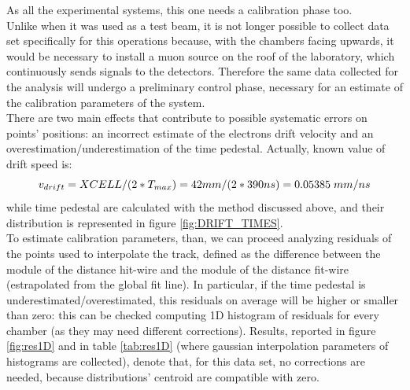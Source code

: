 \documentclass[a4paper,11pt]{book}
\begin{document}
As all the experimental systems, this one needs a calibration phase too.\\
Unlike when it was used as a test beam, it is not longer possible to collect data set specifically for this operations because, with the chambers facing upwards, it would be necessary to install a muon source on the roof of the laboratory, which continuously sends signals to the detectors. Therefore the same data collected for the analysis will undergo a preliminary control phase, necessary for an estimate of the calibration parameters of the system.\\
There are two main effects that contribute to possible systematic errors on points' positions: an incorrect estimate of the electrons drift velocity and an overestimation/underestimation of the time pedestal. Actually, known value of drift speed is:
\[ v_{drift} = XCELL/(2*T_{max}) = 42mm/(2*390ns) = 0.05385\hspace{1mm} mm/ns \]
while time pedestal are calculated with the method discussed above, and their distribution is represented in figure \ref{fig:DRIFT_TIMES}.\\
To estimate calibration parameters, than, we can proceed analyzing residuals of the points used to interpolate the track, defined as the difference between the module of the distance hit-wire and the module of the distance fit-wire (estrapolated from the global fit line). In particular, if the time pedestal is underestimated/overestimated, this residuals on average will be higher or smaller than zero: this can be checked computing 1D histogram of residuals for every chamber (as they may need different corrections). Results, reported in figure \ref{fig:res1D} and in table \ref{tab:res1D} (where gaussian interpolation parameters of histograms are collected), denote that, for this data set, no corrections are needed, because distributions' centroid are compatible with zero.\\
\end{document}

